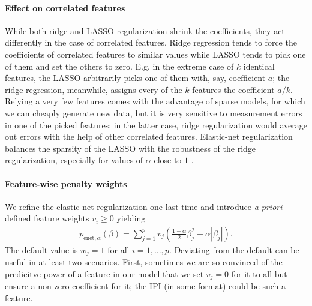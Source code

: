 \paragraph{Effect on correlated features}
While both ridge and LASSO regularization shrink the coefficients, they act differently in the case 
of correlated features. Ridge regression tends to force the coefficients of correlated features to 
similar values while LASSO tends to pick one of them and set the others to zero. E.g, in the 
extreme case of $k$ identical features, the LASSO arbitrarily picks one of them with, say, 
coefficient $a$; the ridge regression, meanwhile, assigns every of the $k$ features the coefficient 
$a/k$. Relying a very few features comes with the advantage of sparse models, for which we 
can cheaply generate new data, but it is very sensitive to measurement errors in one of the picked 
features; in the latter case, ridge regularization would average out errors with the help of other 
correlated features. Elastic-net regularization balances the sparsity of the LASSO with the 
robustness of the ridge regularization, especially for values of $\alpha$ close to $1$ 
\cite{elasticnet05}.

\paragraph{Feature-wise penalty weights}
We refine the elastic-net regularization one last time and introduce \textit{a priori} defined 
feature weights $v_i \geq 0$ yielding
\begin{align}
    p_{\text{enet}, \alpha}(\beta) = \sum_{j=1}^p v_j \left( \frac{1-\alpha}{2} \beta_j^2 +
    \alpha |\beta_j| \right).
\end{align}
The default value is $w_j = 1$ for all $i = 1, \ldots, p$. Deviating from the default can be useful 
in at least two scenarios. First, sometimes we are so convinced of the predicitve 
power of a feature in our model that we set $v_j = 0$ for it to all but ensure a non-zero 
coefficient for it; the IPI (in some format) could be such a feature. 

